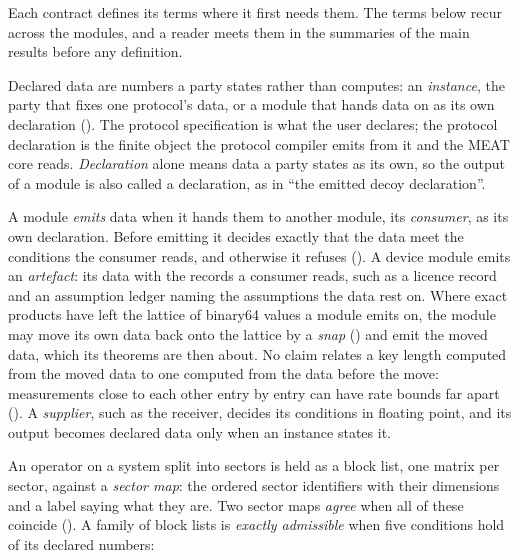 Each contract defines its terms where it first needs them. The terms below
recur across the modules, and a reader meets them in the summaries of the
main results before any definition.

\begin{description}[leftmargin=0pt,itemsep=3pt]
\item[Declared data; specification; declaration.] Declared data are numbers
  a party states rather than computes: an \emph{instance}, the party that
  fixes one protocol's data, or a module that hands data on as its own
  declaration (). The protocol
  specification is what the user declares; the protocol declaration is the
  finite object the protocol compiler emits from it and the MEAT core reads.
  \emph{Declaration} alone means data a party states as its own, so the output
  of a module is also called a declaration, as in ``the emitted decoy
  declaration''.
\item[Emission; artefact; supplier.] A module \emph{emits} data when it hands
  them to another module, its \emph{consumer}, as its own declaration. Before
  emitting it decides exactly that the data meet the conditions the consumer
  reads, and otherwise it refuses (). A
  device module emits an \emph{artefact}: its data with the records a consumer
  reads, such as a licence record and an assumption ledger naming the
  assumptions the data rest on. Where exact products have left the lattice of
  binary64 values a module emits on, the module may move its own data back
  onto the lattice by a \emph{snap} () and emit the
  moved data, which its theorems are then about. No claim relates a key length
  computed from the moved data to one computed from the data before the move:
  measurements close to each other entry by entry can have rate bounds far
  apart (). A \emph{supplier}, such as the
  receiver, decides its conditions in floating point, and its output becomes
  declared data only when an instance states it.
\item[Sector map; exact admissibility.] An operator on a system split into
  sectors is held as a block list, one matrix per sector, against a
  \emph{sector map}: the ordered sector identifiers with their dimensions and
  a label saying what they are. Two sector maps \emph{agree} when all of these
  coincide (). A family of block lists is
  \emph{exactly admissible} when five conditions hold of its declared numbers:

\end{description}
